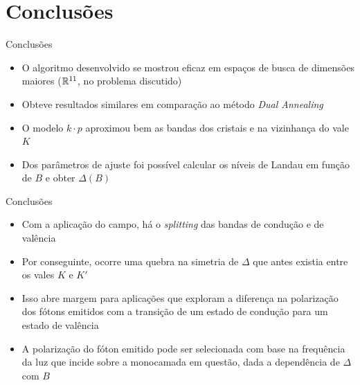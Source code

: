 \section{Conclusões}

\begin{frame}{Conclusões}
  \begin{itemize}
    \item O algoritmo desenvolvido se mostrou eficaz em espaços de busca de
          dimensões maiores ($\mathbb{R}^{11}$, no problema discutido)
    \item Obteve resultados similares em comparação ao método \textit{Dual Annealing}
    \item O modelo $k \cdot p$ aproximou bem as bandas dos cristais  e
           na vizinhança do vale $K$
    \item Dos parâmetros de ajuste foi possível calcular os níveis de Landau em
          função de $B$ e obter $\Delta (B)$
  \end{itemize}
\end{frame}

\begin{frame}{Conclusões}
  \begin{itemize}
    \item Com a aplicação do campo, há o \textit{splitting} das bandas de
          condução e de valência
    \item Por conseguinte, ocorre uma quebra na simetria de $\Delta$ que antes
          existia entre os vales $K$ e $K'$
    \item Isso abre margem para aplicações que exploram a diferença na
          polarização dos fótons emitidos com a transição de um
          estado de condução para um estado de valência
    \item A polarização do fóton emitido pode ser selecionada com base na
          frequência da luz que incide sobre a monocamada em questão, dada a
          dependência de $\Delta$ com $B$
  \end{itemize}
\end{frame}

